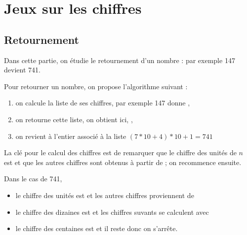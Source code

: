 \chapter{Jeux sur les chiffres}
\thispagestyle{empty}

\vskip -2cm

\section{Retournement} 
Dans cette partie, on étudie le retournement d'un nombre : par exemple 147 devient 741.

Pour retourner un nombre, on propose l'algorithme suivant :
\begin{enumerate}
    \item on calcule la liste de ses chiffres, par exemple 147 donne \type{[1, 4, 7]},
    \item on retourne cette liste, on obtient ici,  \type{[7, 4, 1]}, 
    \item on revient à l'entier associé à la liste $(7*10 + 4)*10 + 1 = 741$
\end{enumerate}

La clé pour le calcul des chiffres est de remarquer que le chiffre des unités de $n$ est  et que les autres chiffres sont obtenus à partir de  ;  on recommence ensuite.

Dans le cas de 741, 
\begin{itemize}
    \item le chiffre des unités est  et les autres chiffres proviennent de 
   \item le chiffre des dizaines est  et les chiffres suvants se calculent avec 
   \item le chiffre des centaines est  et il reste  donc on s'arrête.
\end{itemize}

